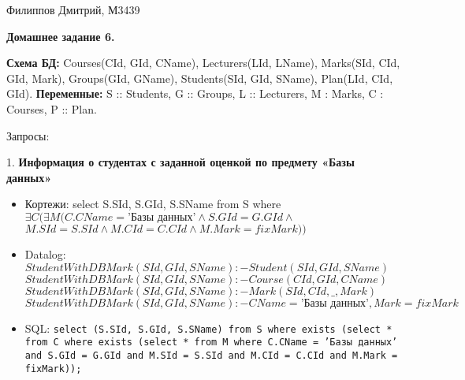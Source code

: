 \documentclass[11pt,a4paper,oneside]{article}
\begin{document}
\renewcommand{\t}[1]{\mbox{\texttt{#1}}}
\newcommand{\s}[1]{\mbox{``\t{#1}''}}
\newcommand{\eps}{\varepsilon}
\renewcommand{\phi}{\varphi}
\newcommand{\plainhat}{{\char 94}}

\newcommand{\Z}{\mathbb{Z}}
\newcommand{\w}[1]{``\t{#1}''}




Филиппов Дмитрий, М3439
\newline

\begin{LARGE} \textbf{Домашнее задание 6.} \end{LARGE}
\newline

\textbf{Схема БД:} Courses(CId, GId, CName), Lecturers(LId, LName), Marks(SId, CId, GId, Mark), Groups(GId, GName), Students(SId, GId, SName), Plan(LId, CId, GId).
\newline
\textbf{Переменные:} S :: Students, G :: Groups, L :: Lecturers, M : Marks, C : Courses, P :: Plan.

Запросы:

1. \textbf{Информация о студентах с заданной оценкой по предмету «Базы данных»}

\begin{itemize}
\item Кортежи: select S.SId, S.GId, S.SName from S where $\exists C (\exists M ( C.CName = \mbox{'Базы данных'} \land S.GId = G.GId \land$ $M.SId = S.SId \land M.CId = C.CId \land M.Mark = fixMark))$
\item Datalog: 
$StudentWithDBMark(SId, GId, SName) :- Student(SId, GId, SName)$
\newline
$StudentWithDBMark(SId, GId, SName) :- Course(CId, GId, CName)$
\newline
$StudentWithDBMark(SId, GId, SName) :- Mark(SId, CId, \_, Mark)$
\newline
$StudentWithDBMark(SId, GId, SName) :- CName = \mbox{'Базы данных'}, Mark = fixMark$

\item SQL: \texttt{select (S.SId, S.GId, S.SName) from S where exists (select * from C where exists (select * from M where C.CName = 'Базы данных' and S.GId = G.GId and M.SId = S.SId and M.CId = C.CId and M.Mark = fixMark));}
\end{itemize}
\end{document}
